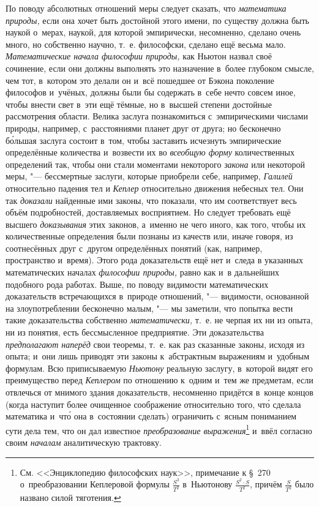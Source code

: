 По поводу абсолютных отношений меры следует сказать, что
{\em математика природы,} если она хочет быть достойной этого имени, по
существу должна быть наукой о~мерах, наукой, для которой эмпирически,
несомненно, сделано очень много, но собственно научно, т.~е. философски,
сделано ещё весьма мало. {\em Математические начала философии природы,} как
Ньютон назвал своё сочинение, если они должны выполнять это назначение в~более
глубоком смысле, чем тот, в~котором это делали он и~всё пошедшее от Бэкона
поколение философов и~учёных, должны были бы содержать в~себе нечто совсем
иное, чтобы внести свет в~эти ещё тёмные, но в~высшей степени достойные
рассмотрения области. Велика заслуга познакомиться с~эмпирическими числами
природы, например, с~расстояниями планет друг от друга; но бесконечно
б\'{о}льшая заслуга состоит в~том, чтобы заставить исчезнуть эмпирические
определённые количества и~возвести их во {\em всеобщую форму} количественных
определений так, чтобы они стали моментами некоторого {\em закона} или
некоторой меры, "--- бессмертные заслуги, которые приобрели себе, например,
{\em Галилей} относительно падения тел и {\em Кеплер} относительно движения
небесных тел. Они так {\em доказали} найденные ими законы, что показали, что им
соответствует весь объём подробностей, доставляемых восприятием. Но следует
требовать ещё высшего {\em доказывания} этих законов, а~именно не чего иного,
как того, чтобы их количественные определения были познаны из качеств или,
иначе говоря, из соотнесённых друг с~другом определённых понятий (как,
например, пространство и~время). Этого рода доказательств ещё нет и~следа в
указанных математических началах {\em философии природы,} равно как и~в
дальнейших подобного рода работах. Выше, по поводу видимости математических
доказательств встречающихся в~природе отношений, "--- видимости, основанной на
злоупотреблении бесконечно малым, "--- мы заметили, что попытка вести такие
доказательства собственно {\em математически,} т.~е. не черпая их ни из опыта,
ни из понятия, есть бессмысленное предприятие. Эти доказательства
{\em предполагают наперёд} свои теоремы, т.~е. как раз сказанные законы, исходя
из опыта; и~они лишь приводят эти законы к~абстрактным выражениям и~удобным
формулам. Всю приписываемую {\em Ньютону} реальную заслугу, в~которой видят его
преимущество перед {\em Кеплером} по отношению к~одним и~тем же предметам, если
отвлечься от мнимого здания доказательств, несомненно придётся в~конце концов
(когда наступит более очищенное соображение относительно того, чт\'{о} сделала
математика и~чт\'{о} она в~состоянии сделать) ограничить с~ясным пониманием
сути дела тем, что он дал известное {\em преобразование выражения}\footnote{См.
<<Энциклопедию философских наук>>, примечание к \S~270 о~преобразовании
Кеплеровой формулы $\frac{S^3}{T^2}$ в~Ньютонову $\frac{S^2\cdot S}{T^2}$,
причём $\frac{S}{T^2}$ было названо силой тяготения.} и~ввёл согласно своим
{\em началам} аналитическую трактовку.

